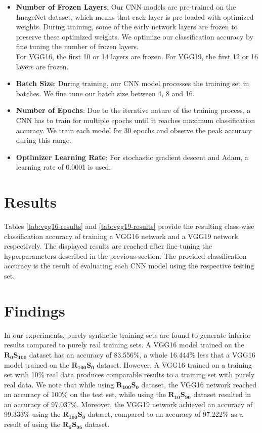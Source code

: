\begin{itemize}
  \item \textbf{Number of Frozen Layers}: Our CNN models are pre-trained on the ImageNet dataset, which means that each layer is pre-loaded with optimized weights. During training, some of the early network layers are frozen to preserve these optimized weights. We optimize our classification accuracy by fine tuning the number of frozen layers.
  \\For VGG16, the first 10 or 14 layers are frozen. For VGG19, the first 12 or 16 layers are frozen.
  \item \textbf{Batch Size}: During training, our CNN model processes the training set in batches. We fine tune our batch size between 4, 8 and 16.
  \item \textbf{Number of Epochs}: Due to the iterative nature of the training process, a CNN has to train for multiple epochs until it reaches maximum classification accuracy. We train each model for 30 epochs and observe the peak accuracy during this range.
  \item \textbf{Optimizer Learning Rate}: For stochastic gradient descent and Adam, a learning rate of 0.0001 is used.
\end{itemize}


\section{Results}\label{sec:results}

Tables \ref{tab:vgg16-results} and \ref{tab:vgg19-results} provide the resulting class-wise classification accuracy of training a VGG16 network and a VGG19 network respectively. The displayed results are reached after fine-tuning the hyperparameters described in the previous section. The provided classification accuracy is the result of evaluating each CNN model using the respective testing set.


\section{Findings}\label{sec:findings}

In our experiments, purely synthetic training sets are found to generate inferior results compared to purely real training sets. A VGG16 model trained on the $\boldsymbol{R_{0}S_{100}}$ dataset has an accuracy of 83.556\%, a whole 16.444\% less that a VGG16 model trained on the $\boldsymbol{R_{100}S_{0}}$ dataset. However, A VGG16 trained on a training set with 10\% real data produces comparable results to a training set with purely real data. We note that while using $\boldsymbol{R_{100}S_{0}}$ dataset, the VGG16 network reached an accuracy of 100\% on the test set, while using the $\boldsymbol{R_{10}S_{90}}$ dataset resulted in an accuracy of 97.037\%. Moreover, the VGG19 network achieved an accuracy of 99.333\% using the $\boldsymbol{R_{100}S_{0}}$ dataset, compared to an accuracy of 97.222\% as a result of using the $\boldsymbol{R_{5}S_{95}}$ dataset.

